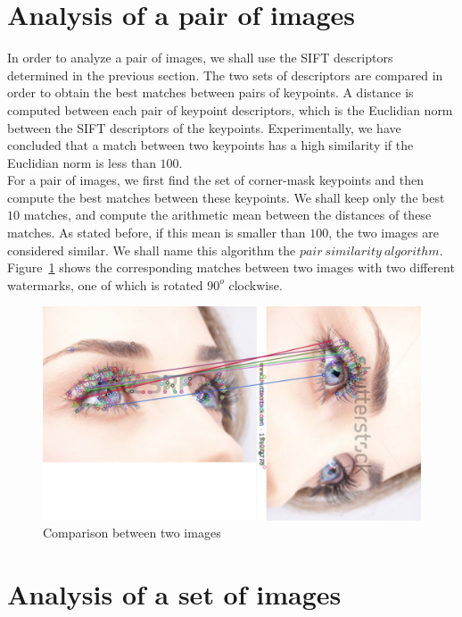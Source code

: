 \section{Analysis of a pair of images}

In order to analyze a pair of images, we shall use the SIFT descriptors determined in the previous section.
The two sets of descriptors are compared in order to obtain the best matches between pairs of keypoints.
A distance is computed between each pair of keypoint descriptors, which is the Euclidian norm between the SIFT descriptors of the keypoints.
Experimentally, we have concluded that a match between two keypoints has a high similarity if the Euclidian norm is less than $100$.\\
For a pair of images, we first find the set of corner-mask keypoints and then compute the best matches between these keypoints. We shall keep only the best $10$ matches, and compute the arithmetic mean between the distances of these matches. As stated before, if this mean is smaller than $100$, the two images are considered similar. We shall name this algorithm the $pair\ similarity\ algorithm$.\\
Figure~\ref{fig:compareImages} shows the corresponding matches between two images with two different watermarks, one of which is rotated $90^o$ clockwise.

\begin{figure}[ht!]
\centering
\includegraphics[width=.8\linewidth]{images/compare.png}
\caption{Comparison between two images}
\label{fig:compareImages}
\end{figure}
 
 
\section{Analysis of a set of images}

